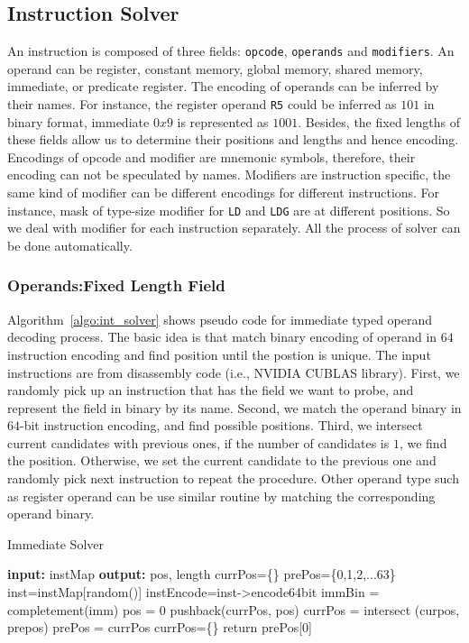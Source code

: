 \subsection{Instruction Solver}
An instruction is composed of three fields: {\tt opcode}, {\tt operands} and {\tt modifiers}. An operand can be register, constant memory, global memory, shared memory, immediate, or predicate register.
The encoding of operands can be inferred by their names. For instance, the register operand {\tt R5} could be
inferred as $101$ in binary format, immediate $0x9$ is represented as $1001$. Besides, the fixed lengths of these fields allow us to determine their positions and lengths and hence encoding. Encodings of opcode and modifier are mnemonic symbols, therefore, their encoding can not be speculated by names. Modifiers are instruction specific, the same kind of modifier can be different encodings for different instructions. For instance, mask of type-size
modifier for {\tt LD} and {\tt LDG} are at different positions. So we deal with modifier for each instruction separately. All the process of solver can be done automatically.

\subsubsection{Operands:Fixed Length Field}
Algorithm~\ref{algo:int_solver} shows pseudo code for immediate typed operand decoding process. 
The basic idea is that match binary encoding of operand in $64$ instruction encoding and find
position until the postion is unique. The input instructions are from disassembly code (i.e., NVIDIA CUBLAS library).
First, we randomly pick up an instruction that has the field we want to probe, and represent the field in binary by its name. Second, we match the operand binary in $64$-bit instruction encoding, and find possible positions. Third, we intersect current candidates with previous ones, if the number of candidates is $1$, we find the position. Otherwise, we set the current candidate to the previous one and randomly pick next instruction to repeat the procedure.
Other operand type such as register operand can be use similar routine by matching the corresponding operand binary.

\begin{algorithm}
      \caption{Immediate Solver}
      \label{algo:int_solver}
  \begin{algorithmic}[1]
	  \State \textbf{input:} instMap
      \State \textbf{output:} pos, length
      \State currPos=\{\}
      \State prePos=\{0,1,2,...63\}
      \State inst=instMap[random()]
      \State instEncode=inst->encode64bit
      \State immBin = completement(imm)
      \State pos = 0
      \State pushback(currPos, pos)
      \EndIf
      \EndWhile
      \State currPos = intersect (curpos, prepos)
      \State prePos = currPos
      \State currPos=\{\}
      \EndIf
      \EndWhile
      \State return prePos[0]
  \end{algorithmic}
\end{algorithm}

